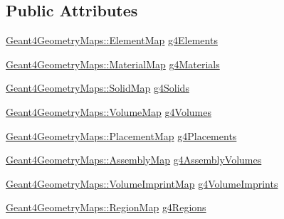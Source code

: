 \subsection*{Public Attributes}
\begin{DoxyCompactItemize}
\item 
\hyperlink{namespace_d_d4hep_1_1_simulation_1_1_geant4_geometry_maps_a175b532b796e7de3d9128c1f0e1ee406}{Geant4GeometryMaps::ElementMap} \hyperlink{class_d_d4hep_1_1_simulation_1_1_geant4_geometry_info_a40b8d4041f5b89826971ffb9d1db9e1c}{g4Elements}
\item 
\hyperlink{namespace_d_d4hep_1_1_simulation_1_1_geant4_geometry_maps_a0ae377c64e684c47bd3045a9d3d8e248}{Geant4GeometryMaps::MaterialMap} \hyperlink{class_d_d4hep_1_1_simulation_1_1_geant4_geometry_info_a371057dc8aa3117cc3dfc465fd692cfb}{g4Materials}
\item 
\hyperlink{namespace_d_d4hep_1_1_simulation_1_1_geant4_geometry_maps_a5591dbffcd2e6432004034209abd630e}{Geant4GeometryMaps::SolidMap} \hyperlink{class_d_d4hep_1_1_simulation_1_1_geant4_geometry_info_ad35660bb944a3d8133ef17abeb898d0f}{g4Solids}
\item 
\hyperlink{namespace_d_d4hep_1_1_simulation_1_1_geant4_geometry_maps_a85199a23e6a837678c8e5d5f902fb2e2}{Geant4GeometryMaps::VolumeMap} \hyperlink{class_d_d4hep_1_1_simulation_1_1_geant4_geometry_info_a6699981243bf97abf6c16e51a72dcabb}{g4Volumes}
\item 
\hyperlink{namespace_d_d4hep_1_1_simulation_1_1_geant4_geometry_maps_a587c0a02d3847f03e6427093c90e93d2}{Geant4GeometryMaps::PlacementMap} \hyperlink{class_d_d4hep_1_1_simulation_1_1_geant4_geometry_info_aa99d9cc649a22de3dc3f05f07558951a}{g4Placements}
\item 
\hyperlink{namespace_d_d4hep_1_1_simulation_1_1_geant4_geometry_maps_ae1f67e315dd299b17e4ea1c58a47b312}{Geant4GeometryMaps::AssemblyMap} \hyperlink{class_d_d4hep_1_1_simulation_1_1_geant4_geometry_info_a663f4e581a601fe42c81bd936c4d6960}{g4AssemblyVolumes}
\item 
\hyperlink{namespace_d_d4hep_1_1_simulation_1_1_geant4_geometry_maps_aade714d6f596f4d83009dcc2f3968d86}{Geant4GeometryMaps::VolumeImprintMap} \hyperlink{class_d_d4hep_1_1_simulation_1_1_geant4_geometry_info_a62c7998ab4b27c040c67577a136e93e9}{g4VolumeImprints}
\item 
\hyperlink{namespace_d_d4hep_1_1_simulation_1_1_geant4_geometry_maps_afb7f77d7599fee831bfb2341123e8377}{Geant4GeometryMaps::RegionMap} \hyperlink{class_d_d4hep_1_1_simulation_1_1_geant4_geometry_info_aee8fb6dc1279abe93e73ccf67c41d011}{g4Regions}

\end{DoxyCompactItemize}
